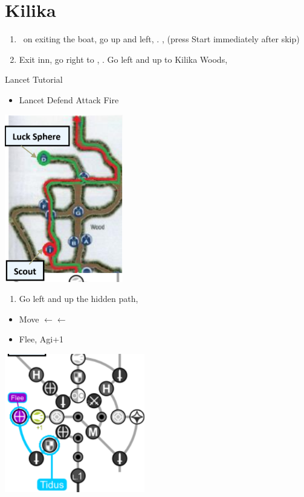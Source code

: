 \chapter{Kilika}

\begin{enumerate}
  \item \sd\ on exiting the boat, go up and left, \sd. \skippablefmv[2:00], (press Start immediately after skip) \sd
  \item Exit inn, go right to \wakka, \sd. Go left and up to Kilika Woods, \sd
\end{enumerate}
\begin{battle}{Lancet Tutorial}
  \begin{itemize}
    \item \sd
    \kimahrif Lancet
          \switch{\kimahri}{\yuna}
          \yunaf Defend
          \tidusf Attack
          \luluf Fire
  \end{itemize}
\end{battle}
\includegraphics{graphics/kilikamap}
\begin{enumerate}[resume]
  \item Go left and up the hidden path, 
\end{enumerate}
\begin{spheregrid}
  \begin{itemize}
    \tidusf
    \begin{itemize}
    \item Move $\leftarrow\leftarrow$
    \item Flee, Agi+1
    \end{itemize}
  \end{itemize}
  \includegraphics{graphics/tidusflee}
\end{spheregrid}
